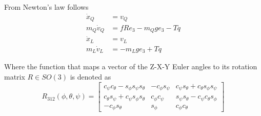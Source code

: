 From Newton's law follows
\begin{equation}\label{eq:newton}
\begin{aligned}
\dot{x}_Q &= v_Q\\
m_Q\dot{v}_Q &=fRe_3-m_Qge_3-Tq\\
\dot{x}_L &= v_L\\
m_L\dot{v}_L &=-m_Lge_3+Tq
\end{aligned}
\end{equation}

Where the function that maps a vector of the Z-X-Y Euler angles to its rotation matrix $ R\in SO(3) $ is denoted as \cite{Mahony2012}
\begin{equation}\label{key}
R_{312}({\phi},{\theta},{\psi})=\begin{bmatrix}
c_{\psi}c_{\theta}-s_{\phi}s_{\psi}s_{\theta}&-c_{\phi}s_{\psi}&c_{\psi}s_{\theta}+c_{\theta}s_{\phi}s_{\psi}\\
c_{\theta}s_{\psi}+c_{\psi}s_{\phi}s_{\theta}&c_{\phi}c_{\psi}&s_{\psi}s_{\theta}-c_{\psi}c_{\theta}s_{\phi}\\
-c_{\phi}s_{\theta}&s_{\phi}&c_{\phi}c_{\theta}
\end{bmatrix}
\end{equation}

